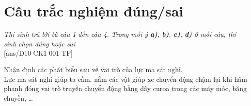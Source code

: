 \section{Câu trắc nghiệm đúng/sai} 
\textit{Thí sinh trả lời từ câu 1 đến câu 4. Trong mỗi ý \textbf{a)}, \textbf{b)}, \textbf{c)}, \textbf{d)} ở mỗi câu, thí sinh chọn đúng hoặc sai}
\setcounter{ex}{0}\\
[ans/D10-CK1-001-TF]
\begin{ex}
	Nhận định các phát biểu sau về vai trò của lực ma sát nghỉ.\\
	Lực ma sát nghỉ
	{\True giúp ta cầm, nắm các vật}
	{giúp xe chuyển động chậm lại khi hãm phanh}
	{\True đóng vai trò truyền chuyển động bằng dây curoa trong các máy móc, băng chuyền, \dots}
	\loigiai{}
\end{ex}

